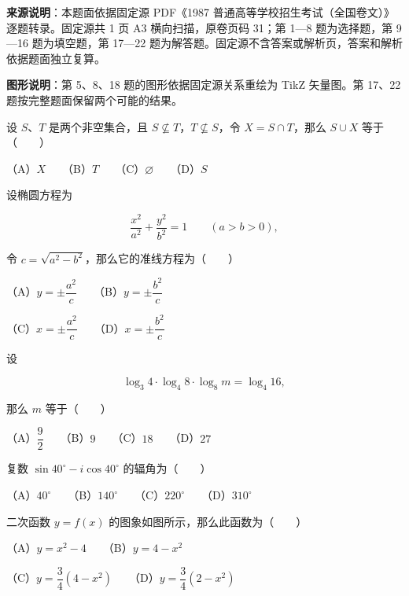 


\begin{gktip}
\textbf{来源说明}：本题面依据固定源 PDF《1987 普通高等学校招生考试（全国卷文）》逐题转录。固定源共 1 页 A3 横向扫描，原卷页码 31；第 1—8 题为选择题，第 9—16 题为填空题，第 17—22 题为解答题。固定源不含答案或解析页，答案和解析依据题面独立复算。

\textbf{图形说明}：第 5、8、18 题的图形依据固定源关系重绘为 TikZ 矢量图。第 17、22 题按完整题面保留两个可能的结果。
\end{gktip}

\begin{question}
设 $S\text{、}T$ 是两个非空集合，且 $S\nsubseteq T$，$T\nsubseteq S$，令 $X=S\cap T$，那么 $S\cup X$ 等于\mbox{（　　）}

（A）$X$　　（B）$T$　　（C）$\varnothing$　　（D）$S$

\end{question}
\begin{question}
设椭圆方程为

\nopagebreak[4]
\[
\frac{x^2}{a^2}+\frac{y^2}{b^2}=1\qquad(a>b>0),
\]

令 $c=\sqrt{a^2-b^2}$，那么它的准线方程为\mbox{（　　）}

（A）$y=\pm\dfrac{a^2}{c}$　　（B）$y=\pm\dfrac{b^2}{c}$

（C）$x=\pm\dfrac{a^2}{c}$　　（D）$x=\pm\dfrac{b^2}{c}$

\end{question}
\begin{question}
设

\nopagebreak[4]
\[
\log_3 4\cdot\log_4 8\cdot\log_8m=\log_4 16,
\]

那么 $m$ 等于\mbox{（　　）}

（A）$\dfrac92$　　（B）$9$　　（C）$18$　　（D）$27$

\end{question}
\begin{question}
复数 $\sin40^\circ-i\cos40^\circ$ 的辐角为\mbox{（　　）}

（A）$40^\circ$　　（B）$140^\circ$　　（C）$220^\circ$　　（D）$310^\circ$

\Needspace{0.4\textheight}
\end{question}
\begin{question}
二次函数 $y=f(x)$ 的图象如图所示，那么此函数为\mbox{（　　）}
\nopagebreak[4]
\begin{center}\end{center}
\nopagebreak[4]
（A）$y=x^2-4$　　（B）$y=4-x^2$

（C）$y=\dfrac34(4-x^2)$　　（D）$y=\dfrac34(2-x^2)$

\end{question}
